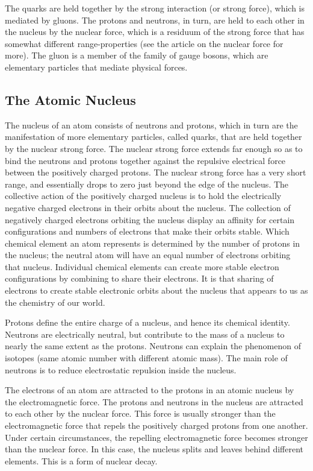 \documentclass[
]{book}
\begin{document}
The quarks are held together by the strong interaction (or strong force), which is mediated by gluons. The protons and neutrons, in turn, are held to each other in the nucleus by the nuclear force, which is a residuum of the strong force that has somewhat different range-properties (see the article on the nuclear force for more). The gluon is a member of the family of gauge bosons, which are elementary particles that mediate physical forces.

\hypertarget{the-atomic-nucleus}{%
\subsection{The Atomic Nucleus}\label{the-atomic-nucleus}}

The nucleus of an atom consists of neutrons and protons, which in turn are the manifestation of more elementary particles, called quarks, that are held together by the nuclear strong force. The nuclear strong force extends far enough so as to bind the neutrons and protons together against the repulsive electrical force between the positively charged protons. The nuclear strong force has a very short range, and essentially drops to zero just beyond the edge of the nucleus. The collective action of the positively charged nucleus is to hold the electrically negative charged electrons in their orbits about the nucleus. The collection of negatively charged electrons orbiting the nucleus display an affinity for certain configurations and numbers of electrons that make their orbits stable. Which chemical element an atom represents is determined by the number of protons in the nucleus; the neutral atom will have an equal number of electrons orbiting that nucleus. Individual chemical elements can create more stable electron configurations by combining to share their electrons. It is that sharing of electrons to create stable electronic orbits about the nucleus that appears to us as the chemistry of our world.

Protons define the entire charge of a nucleus, and hence its chemical identity. Neutrons are electrically neutral, but contribute to the mass of a nucleus to nearly the same extent as the protons. Neutrons can explain the phenomenon of isotopes (same atomic number with different atomic mass). The main role of neutrons is to reduce electrostatic repulsion inside the nucleus.

The electrons of an atom are attracted to the protons in an atomic nucleus by the electromagnetic force. The protons and neutrons in the nucleus are attracted to each other by the nuclear force. This force is usually stronger than the electromagnetic force that repels the positively charged protons from one another. Under certain circumstances, the repelling electromagnetic force becomes stronger than the nuclear force. In this case, the nucleus splits and leaves behind different elements. This is a form of nuclear decay.
\end{document}
